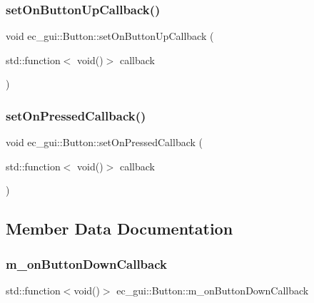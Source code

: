\subsubsection{\texorpdfstring{set\+On\+Button\+Up\+Callback()}{setOnButtonUpCallback()}}
{\footnotesize\ttfamily void ec\+\_\+gui\+::\+Button\+::set\+On\+Button\+Up\+Callback (\begin{DoxyParamCaption}\item[{std\+::function$<$ void()$>$}]{callback }\end{DoxyParamCaption})}

\mbox{\label{classec__gui_1_1_button_a2db872af3725958fafc6c1fe59c7c971}} 
\subsubsection{\texorpdfstring{set\+On\+Pressed\+Callback()}{setOnPressedCallback()}}
{\footnotesize\ttfamily void ec\+\_\+gui\+::\+Button\+::set\+On\+Pressed\+Callback (\begin{DoxyParamCaption}\item[{std\+::function$<$ void()$>$}]{callback }\end{DoxyParamCaption})}



\subsection{Member Data Documentation}
\mbox{\label{classec__gui_1_1_button_a64f82706542dbeb39b5b0db328040bce}} 
\subsubsection{\texorpdfstring{m\+\_\+on\+Button\+Down\+Callback}{m\_onButtonDownCallback}}
{\footnotesize\ttfamily std\+::function$<$void()$>$ ec\+\_\+gui\+::\+Button\+::m\+\_\+on\+Button\+Down\+Callback\hspace{0.3cm}{\ttfamily [protected]}}

